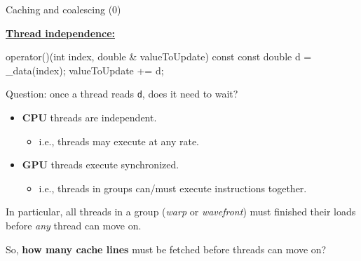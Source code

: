 
\begin{frame}[fragile]{Caching and coalescing (0)}

  \ul{\textbf{Thread independence:}}

  \begin{code}[keywords={}]
operator()(int index, double & valueToUpdate) const {
  const double d = _data(index);
  valueToUpdate += d;
}
  \end{code}

  Question: once a thread reads \texttt{d}, does it need to wait?

  \pause

  \begin{itemize}
    \item \textbf{CPU} threads are independent.
       \begin{itemize}
	   \item i.e., threads may execute at any rate.
       \end{itemize}
  \item<3->{\textbf{GPU} threads execute synchronized. 
	  \begin{itemize}
	     \item i.e., threads in groups can/must execute instructions together.
	  \end{itemize}}
  \end{itemize}

  \pause
  \pause

	In particular, all threads in a group (\emph{warp} or \emph{wavefront}) must finished their loads before \emph{any} thread can move on.

  \vspace{5pt}

  \pause

  So, \textbf{how many cache lines} must be fetched before threads can move on?

\end{frame}


